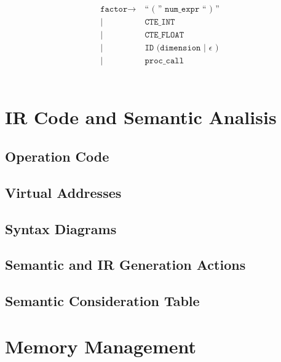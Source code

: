 \begin{align*}
	\texttt{factor}
	\rightarrow&\ \texttt{`` ( '' num\_expr `` ) ''}\\
            |&\ \texttt{CTE\_INT}\\
            |&\ \texttt{CTE\_FLOAT}\\
            |&\ \texttt{ID (dimension | } \epsilon \texttt{ )}\\
            |&\ \texttt{proc\_call}\\
	\phantom{0}\\
\end{align*}

\section{IR Code and Semantic Analisis}
\subsection{Operation Code}
\subsection{Virtual Addresses}
\subsection{Syntax Diagrams}
\subsection{Semantic and IR Generation Actions}
\subsection{Semantic Consideration Table}

\section{Memory Management}
